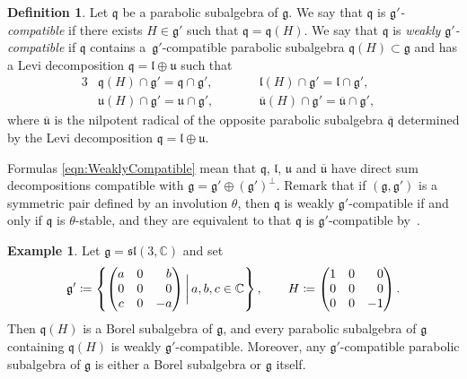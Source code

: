 \documentclass[11pt]{article}
\numberwithin{equation}{section}
\numberwithin{equation}{section}
\theoremstyle{definition}
\newtheorem{Definition}[Theorem]{Definition}
\newtheorem{Example}[Theorem]{Example}
\newcommand{\set}[1]{\left\{#1 \right\}}
\newcommand{\BasicRing}[1]{\mathbb{#1}}
\newcommand{\CC}{\BasicRing{C}}
\newcommand{\classicalg}[1]{\mathfrak{#1}}
\newcommand{\lie}[1]{\mathfrak{#1}}
\newcommand{\lieSL}{\classicalg{sl}}
\begin{document}
\begin{Definition}\label{def:WeaklyCompatible}
	Let $\lie{q}$ be a parabolic subalgebra of $\lie{g}$.
	We say that $\lie{q}$ is \emph{$\lie{g'}$-compatible} if there exists $H \in \lie{g'}$ such that $\lie{q} = \lie{q}(H)$.
	We say that $\lie{q}$ is \emph{weakly $\lie{g'}$-compatible} if $\lie{q}$ contains a~$\lie{g'}$-compatible parabolic subalgebra $\lie{q}(H) \subset \lie{g}$ and has a Levi decomposition $\lie{q} = \lie{l} \oplus \lie{u}$ such that
	\begin{alignat}{3}
		&\lie{q}(H) \cap \lie{g'} = \lie{q} \cap \lie{g}', \qquad&& \lie{l}(H)\cap \lie{g'} = \lie{l} \cap \lie{g}',& \nonumber \\
		&\lie{u}(H)\cap \lie{g'} = \lie{u} \cap \lie{g}', \qquad&& \lie{\overline{u}}(H)\cap \lie{g'} = \lie{\overline{u}} \cap \lie{g'},& \label{eqn:WeaklyCompatible}
	\end{alignat}
	where $\lie{\overline{u}}$ is the nilpotent radical of the opposite parabolic subalgebra $\lie{\overline{q}}$ determined by the Levi decomposition $\lie{q} = \lie{l}\oplus \lie{u}$.
\end{Definition}

Formulas \eqref{eqn:WeaklyCompatible} mean that $\lie{q}$, $\lie{l}$, $\lie{u}$ and $\lie{\overline{u}}$ have direct sum decompositions compatible with $\lie{g} = \lie{g'}\oplus (\lie{g'})^\perp$.
Remark that if $(\lie{g}, \lie{g'})$ is a symmetric pair defined by an involution $\theta$,
then $\lie{q}$ is weakly $\lie{g'}$-compatible if and only if $\lie{q}$ is $\theta$-stable,
and they are equivalent to that $\lie{q}$ is $\lie{g'}$-compatible by~\cite[Proposition~4.76]{KnVo95_cohomological_induction}.

\begin{Example}
	Let $\lie{g} = \lieSL(3, \CC)$ and set
	\begin{align*}
		\lie{g'} \coloneq \set{\begin{pmatrix} a & 0 & \hphantom{-}b \\ 0 & 0 & \hphantom{-}0 \\ c & 0 & -a \end{pmatrix} \bigg|\, a, b, c \in \CC}, \qquad H \coloneq \begin{pmatrix} 1 & 0 & \hphantom{-}0 \\ 0 & 0 & \hphantom{-}0 \\ 0 & 0 & -1 \end{pmatrix}.
	\end{align*}
	Then $\lie{q}(H)$ is a Borel subalgebra of $\lie{g}$, and every parabolic subalgebra of $\lie{g}$ containing $\lie{q}(H)$ is weakly $\lie{g'}$-compatible.
	Moreover, any $\lie{g'}$-compatible parabolic subalgebra of $\lie{g}$ is either a Borel subalgebra or $\lie{g}$ itself.
\end{Example}
\end{document}
